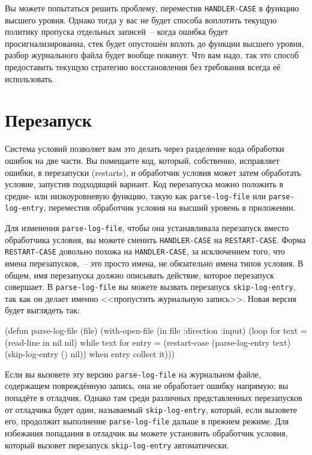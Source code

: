 Вы можете попытаться решить проблему, переместив \lstinline{HANDLER-CASE} в функцию высшего
уровня. Однако тогда у вас не будет способа воплотить текущую политику пропуска отдельных
записей~-- когда ошибка будет просигнализированна, стек будет опустошён вплоть до функции
высшего уровня, разбор журнального файла будет вообще покинут. Что вам надо, так это
способ предоставить текущую стратегию восстановления без требования всегда её
использовать.

\section{Перезапуск}

Система условий позволяет вам это делать через разделение кода обработки ошибок на две
части. Вы помещаете код, который, собственно, исправляет ошибки, в перезапуски (restarts), и
обработчик условия может затем обработать условие, запустив подходящий вариант. Код
перезапуска можно положить в средне- или низкоуровневую функцию, такую как
\lstinline{parse-log-file} или \lstinline{parse-log-entry}, переместив обработчик условия на высший
уровень в приложении.

Для изменения \lstinline{parse-log-file}, чтобы она устанавливала перезапуск вместо обработчика
условия, вы можете сменить \lstinline{HANDLER-CASE} на \lstinline{RESTART-CASE}. Форма
\lstinline{RESTART-CASE} довольно похожа на \lstinline{HANDLER-CASE}, за исключением того, что имена
перезапусков,~-- это просто имена, не обязательно имена типов условия. В общем, имя
перезапуска должно описывать действие, которое перезапуск совершает. В
\lstinline{parse-log-file} вы можете вызвать перезапуск \lstinline{skip-log-entry}, так как он делает
именно <<пропустить журнальную запись>>. Новая версия будет выглядеть так:

\begin{myverb}
(defun parse-log-file (file)
  (with-open-file (in file :direction :input)
    (loop for text = (read-line in nil nil) while text
       for entry = (restart-case (parse-log-entry text)
                     (skip-log-entry () nil))
       when entry collect it)))
\end{myverb}

Если вы вызовете эту версию \lstinline{parse-log-file} на журнальном файле, содержащем
повреждённую запись, она не обработает ошибку напрямую; вы попадёте в отладчик. Однако
там среди различных представленных перезапусков от отладчика будет один, называемый
\lstinline{skip-log-entry}, который, если вызовете его, продолжит выполнение
\lstinline{parse-log-file} дальше в прежнем режиме. Для избежания попадания в отладчик вы
можете установить обработчик условия, который вызовет перезапуск \lstinline{skip-log-entry}
автоматически.

